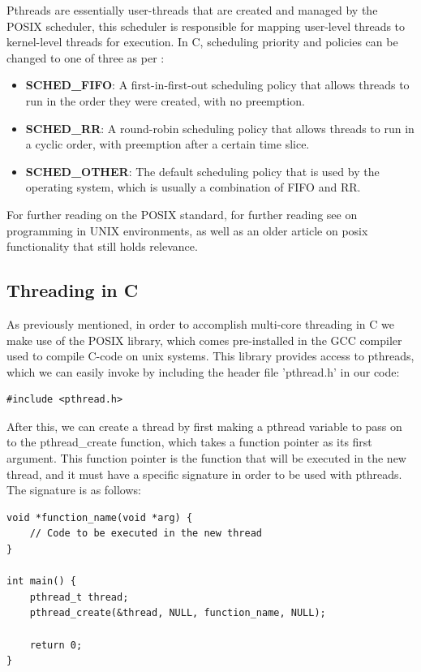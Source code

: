 \documentclass[12pt,a4paper]{article}
\begin{document}
Pthreads are essentially user-threads that are created and managed by the POSIX scheduler, this scheduler is responsible for mapping user-level threads to kernel-level threads for execution. In C, scheduling priority and policies can be changed to one of three as per \cite[pp. 359-360]{Rauber2023}:

\begin{itemize}
    \item \textbf{SCHED\_FIFO}: A first-in-first-out scheduling policy that allows threads to run in the order they were created, with no preemption.
    \item \textbf{SCHED\_RR}: A round-robin scheduling policy that allows threads to run in a cyclic order, with preemption after a certain time slice.
    \item \textbf{SCHED\_OTHER}: The default scheduling policy that is used by the operating system, which is usually a combination of FIFO and RR.
\end{itemize}

For further reading on the POSIX standard, for further reading see  on programming in UNIX environments, as well as  an older article on posix functionality that still holds relevance.

\subsection{Threading in C}

As previously mentioned, in order to accomplish multi-core threading in C we make use of the POSIX library, which comes pre-installed in the GCC compiler used to compile C-code on unix systems. This library provides access to pthreads, which we can easily invoke by including the header file 'pthread.h' in our code:

\begin{verbatim}
#include <pthread.h>
\end{verbatim}

After this, we can create a thread by first making a pthread variable to pass on to the pthread\_create function, which takes a function pointer as its first argument. This function pointer is the function that will be executed in the new thread, and it must have a specific signature in order to be used with pthreads. The signature is as follows:

\begin{verbatim}
void *function_name(void *arg) {
    // Code to be executed in the new thread
}

int main() {
    pthread_t thread;
    pthread_create(&thread, NULL, function_name, NULL);

    return 0;
}
\end{verbatim}
\end{document}
